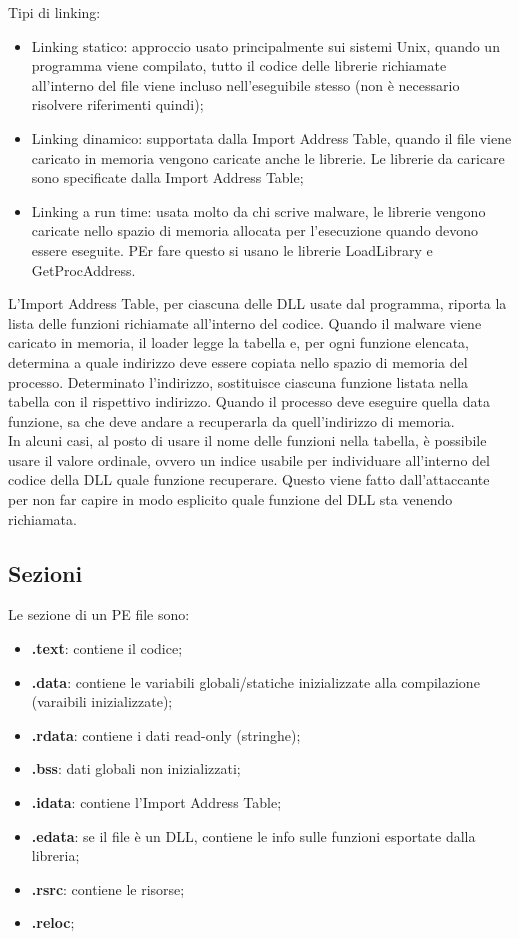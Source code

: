 \documentclass[a4paper]{book}
\begin{document}
Tipi di linking:
\begin{itemize}
    \item Linking statico: approccio usato principalmente sui sistemi Unix, quando un programma viene compilato, tutto il codice delle librerie richiamate all'interno del file viene incluso nell'eseguibile stesso (non è necessario risolvere riferimenti quindi);
    \item Linking dinamico: supportata dalla Import Address Table, quando il file viene caricato in memoria vengono caricate anche le librerie. Le librerie da caricare sono specificate dalla Import Address Table;
    \item Linking a run time: usata molto da chi scrive malware, le librerie vengono caricate nello spazio di memoria allocata per l'esecuzione quando devono essere eseguite. PEr fare questo si usano le librerie LoadLibrary e GetProcAddress.
\end{itemize}

L'Import Address Table, per ciascuna delle DLL usate dal programma, riporta la lista delle funzioni richiamate all'interno del codice. Quando il malware viene caricato in memoria, il loader legge la tabella e, per ogni funzione elencata, determina a quale indirizzo deve essere copiata nello spazio di memoria del processo. Determinato l'indirizzo, sostituisce ciascuna funzione listata nella tabella con il rispettivo indirizzo. Quando il processo deve eseguire quella data funzione, sa che deve andare a recuperarla da quell'indirizzo di memoria.
\\

In alcuni casi, al posto di usare il nome delle funzioni nella tabella, è possibile usare il valore ordinale, ovvero un indice usabile per individuare all'interno del codice della DLL quale funzione recuperare. Questo viene fatto dall'attaccante  per non far capire in modo esplicito quale funzione del DLL sta venendo richiamata.

\subsection{Sezioni}
Le sezione di un PE file sono:
\begin{itemize}
    \item \textbf{.text}: contiene il codice;
    \item \textbf{.data}: contiene le variabili globali/statiche inizializzate alla compilazione (varaibili inizializzate);
    \item \textbf{.rdata}: contiene i dati read-only (stringhe);
    \item \textbf{.bss}: dati globali non inizializzati;
    \item \textbf{.idata}: contiene l'Import Address Table;
    \item \textbf{.edata}: se il file è un DLL, contiene le info sulle funzioni esportate dalla libreria;
    \item \textbf{.rsrc}: contiene le risorse;
    \item \textbf{.reloc};
\end{itemize}
\end{document}
